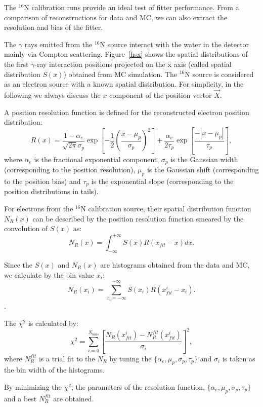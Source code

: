 The $^{16}$N calibration runs provide an ideal test of fitter performance. From a comparison of reconstructions for data and MC, we can also extract the resolution and bias of the fitter.

The $\gamma$ rays emitted from the $^{16}$N source interact with the water in the detector mainly via Compton scattering. Figure~\ref{hsx} shows the spatial distributions of the first $\gamma$-ray interaction positions projected on the x axis (called spatial distribution $S(x)$) obtained from MC simulation. The $^{16}$N source is considered as an electron source with a known spatial distribution\cite{boulay}. For simplicity, in the following we always discuss the $x$ component of the position vector $\vec{X}$. 


A position resolution function is defined for the reconstructed electron position distribution\cite{boulay}:
\[
R(x)=\frac{1-\alpha_e}{\sqrt{2\pi}\sigma_p}\exp{[-\frac{1}{2}(\frac{x-\mu_p}{\sigma_p})^2]+\frac{\alpha_e}{2\tau_p}\exp{[\frac{-|x-\mu_p|}{\tau_p}]}},
\]
where $\alpha_e$ is the fractional exponential component, $\sigma_p$ is
the Gaussian width (corresponding to the position resolution), $\mu_p$ is the Gaussian shift  (corresponding to the position bias) and $\tau_p$ is the exponential slope (corresponding to the position distributions in tails).

For electrons from the $^{16}$N calibration source, their spatial distribution function $N_{R}(x)$ can be described by the position resolution function smeared by the convolution of $S(x)$ as\cite{boulay}:
\[
N_{R}(x)=\int^{+\infty}_{-\infty} S(x)R(x_{fit}-x)dx.
\]

Since the $S(x)$ and $N_{R}(x)$ are histograms obtained from the data and MC, we calculate by the bin value $x_i$: 
\[N_R(x_i)=\sum_{x_i=-\infty}^{+\infty}S(x_i)R(x_{fit}^i-x_i).\].

The $\chi^2$ is calculated by:
\[
\chi^2=\sum^{N_{bins}}_{i=0}[\frac{N_R(x_{fit}^i)-N_R^{fit}(x_{fit}^i)}{\sigma_i}]^2,
\]
where $N_R^{fit}$ is a trial fit to the $N_R$ by tuning the $\{\alpha_e,\mu_p,\sigma_p,\tau_p\}$ and $\sigma_i$ is taken as the bin width of the histograms.

By minimizing the $\chi^2$, the parameters of the resolution function, $\{\alpha_e,\mu_p,\sigma_p,\tau_p\}$ and a best $N_R^{fit}$ are obtained.

